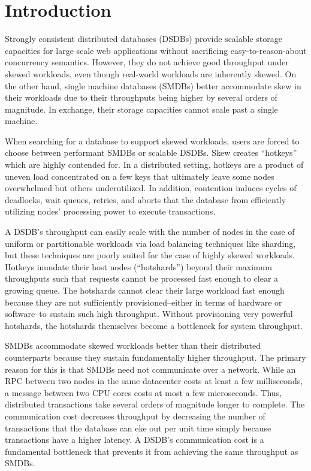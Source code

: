 \section{Introduction}
Strongly consistent distributed databases (DSDBs) provide scalable storage capacities for large scale web applications without sacrificing easy-to-reason-about concurrency semantics. However, they do not achieve good throughput under skewed workloads, even though real-world workloads are inherently skewed. On the other hand, single machine databases (SMDBs) better accommodate skew in their workloads due to their throughputs being higher by several orders of magnitude. In exchange, their storage capacities cannot scale past a single machine.

When searching for a database to support skewed workloads, users are forced to choose between performant SMDBs or scalable DSDBs. Skew creates “hotkeys” which are highly contended for. In a distributed setting, hotkeys are a product of uneven load concentrated on a few keys that ultimately leave some nodes overwhelmed but others underutilized. In addition, contention induces cycles of deadlocks, wait queues, retries, and aborts that the database from efficiently utilizing nodes’ processing power to execute transactions.

A DSDB’s throughput can easily scale with the number of nodes in the case of uniform or partitionable workloads via load balancing techniques like sharding, but these techniques are poorly suited for the case of highly skewed workloads. Hotkeys inundate their host nodes (“hotshards”) beyond their maximum throughputs such that requests cannot be processed fast enough to clear a growing queue. The hotshards cannot clear their large workload fast enough because they are not sufficiently provisioned--either in terms of hardware or software--to sustain such high throughput. Without provisioning very powerful hotshards, the hotshards themselves become a bottleneck for system throughput.

SMDBs accommodate skewed workloads better than their distributed counterparts because they sustain fundamentally higher throughput. The primary reason for this is that SMDBs need not communicate over a network. While an RPC between two nodes in the same datacenter costs at least a few milliseconds, a message between two CPU cores costs at most a few microseconds. Thus, distributed transactions take several orders of magnitude longer to complete. The communication cost decreases throughput by decreasing the number of transactions that the database can eke out per unit time simply because transactions have a higher latency. A DSDB’s communication cost is a fundamental bottleneck that prevents it from achieving the same throughput as SMDBs.


